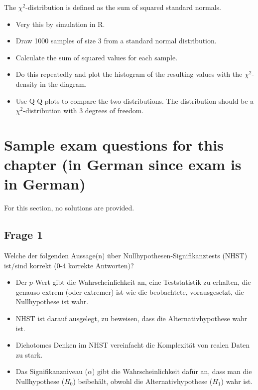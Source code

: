 \documentclass[
]{book}
\providecommand{\tightlist}{%
  \setlength{\itemsep}{0pt}\setlength{\parskip}{0pt}}
\begin{document}
The \(\chi^2\)-distribution is defined as the sum of squared standard normals.

\begin{itemize}
\tightlist
\item
  Very this by simulation in R.
\item
  Draw 1000 samples of size 3 from a standard normal distribution.
\item
  Calculate the sum of squared values for each sample.
\item
  Do this repeatedly and plot the histogram of the resulting values with the \(\chi^2\)-density in the diagram.
\item
  Use Q-Q plots to compare the two distributions. The distribution should be a \(\chi^2\)-distribution with 3 degrees of freedom.
\end{itemize}

\section{Sample exam questions for this chapter (in German since exam is in German)}\label{sample-exam-questions-for-this-chapter-in-german-since-exam-is-in-german-3}

For this section, no solutions are provided.

\subsection{Frage 1}\label{frage-1-1}

Welche der folgenden Aussage(n) über Nullhypothesen-Signifikanztests (NHST) ist/sind korrekt (0-4 korrekte Antworten)?

\begin{itemize}
\tightlist
\item
  Der \(p\)-Wert gibt die Wahrscheinlichkeit an, eine Teststatistik zu erhalten,
  die genauso extrem (oder extremer) ist wie die beobachtete, vorausgesetzt, die Nullhypothese ist wahr.
\item
  NHST ist darauf ausgelegt, zu beweisen, dass die Alternativhypothese wahr ist.
\item
  Dichotomes Denken im NHST vereinfacht die Komplexität von realen Daten zu stark.
\item
  Das Signifikanzniveau (\(\alpha\)) gibt die Wahrscheinlichkeit dafür an, dass man die
  Nullhypothese (\(H_0\)) beibehält, obwohl die Alternativhypothese (\(H_1\)) wahr ist.
\end{itemize}
\end{document}
